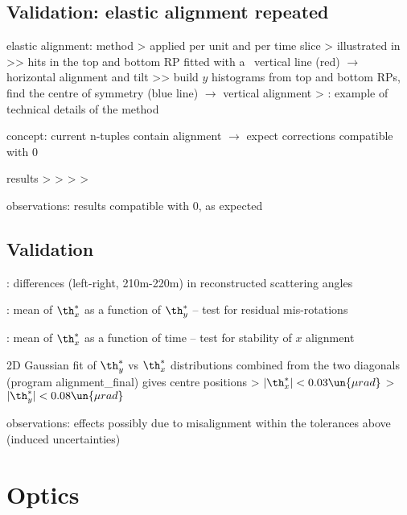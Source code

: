 \subsection{Validation: elastic alignment repeated}

\> elastic alignment: method
\>> applied per unit and per time slice
\>> illustrated in 
\>>> hits in the top and bottom RP fitted with a ~vertical line (red) $\rightarrow$ horizontal alignment and tilt
\>>> build $y$ histograms from top and bottom RPs, find the centre of symmetry (blue line) $\rightarrow$ vertical alignment
\>> : example of technical details of the method

\> concept: current n-tuples contain alignment $\rightarrow$ expect corrections compatible with 0

\> results
\>> 
\>> 
\>> 
\>> 

\> observations: results compatible with 0, as expected

\subsection{Validation}

\> : differences (left-right, 210m-220m) in reconstructed scattering angles

\> : mean of $\th_x^*$ as a function of $\th_y^*$ -- test for residual mis-rotations

\> :  mean of $\th_x^*$ as a function of time -- test for stability of $x$ alignment

\> 2D Gaussian fit of $\th^*_y$ vs $\th^*_x$ distributions combined from the two diagonals (program alignment\_final) gives centre positions
\>> $|\th^*_x| < 0.03\un{\mu rad}$
\>> $|\th^*_y| < 0.08\un{\mu rad}$

\> observations: effects possibly due to misalignment within the tolerances above (induced uncertainties)



\section{Optics}

